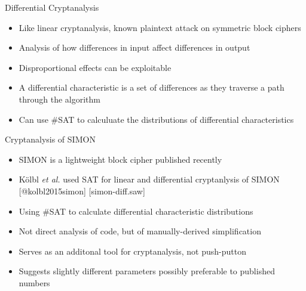 \documentclass[ignorenonframetext,]{beamer}
\providecommand{\tightlist}{%
  \setlength{\itemsep}{0pt}\setlength{\parskip}{0pt}}
\newcommand{\infile}[1]{{\tiny \alert{[#1]}}}
\begin{document}
\begin{frame}{Differential Cryptanalysis}

\begin{itemize}
\tightlist
\item
  Like linear cryptanalysis, known plaintext attack on symmetric block
  ciphers
\item
  Analysis of how differences in input affect differences in output
\item
  Disproportional effects can be exploitable
\item
  A \alert{differential characteristic} is a set of differences as they
  traverse a path through the algorithm
\item
  Can use \#SAT to calculuate the distributions of differential
  characteristics
\end{itemize}

\end{frame}

\begin{frame}{Cryptanalysis of SIMON}

\begin{itemize}
\tightlist
\item
  SIMON is a lightweight block cipher published recently
\item
  Kölbl \emph{et al.} used SAT for linear and differential cryptanlysis
  of SIMON {[}@kolbl2015simon{]} \infile{simon-diff.saw}
\item
  Using \#SAT to calculate differential characteristic distributions
\item
  Not direct analysis of code, but of manually-derived simplification
\item
  Serves as an additonal tool for cryptanalysis, not push-putton
\item
  Suggests slightly different parameters possibly preferable to
  published numbers
\end{itemize}

\end{frame}
\end{document}
